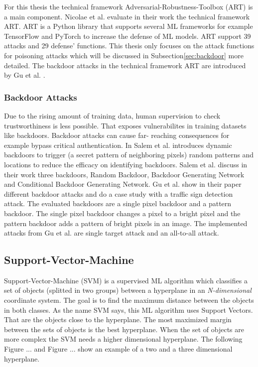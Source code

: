 For this thesis the technical framework Adversarial-Robustness-Toolbox (ART) \cite{art2018} is a main component. Nicolae et al. \cite{DBLP:journals/corr/abs-1807-01069} evaluate in their work the
technical framework ART. ART is a Python library that supports several ML frameworks for example TensorFlow and PyTorch to increase the defense of ML models. ART support 39 attacks and 29 defense'
functions. This thesis only focuses on the attack functions for poisoning attacks which will be discussed in Subsection\ref{sec:backdoor} more detailed. The backdoor attacks in the technical framework
ART are introduced by Gu et al. \cite{DBLP:journals/corr/abs-1708-06733}.

\subsubsection*{Backdoor Attacks}
Due to the rising amount of training data, human supervision to check trustworthiness is less possible. That exposes vulnerabilites in training datasets like backdoors. Backdoor attacks can cause far-
reaching consequences for example bypass critical authentication. In \cite{DBLP:journals/corr/abs-2003-03675} Salem et al. introduces dynamic backdoors to trigger (a secret pattern of neighboring
pixels) random patterns and locations to reduce the efficacy on identifying backdoors. Salem et al. discuss in their work three backdoors, Random Backdoor, Backdoor Generating Network and Conditional
Backdoor Generating Network.
Gu et al. show in their paper different backdoor attacks and do a case study with a traffic sign detection attack. The evaluated backdoors are a single pixel backdoor and a pattern backdoor. The single
pixel backdoor changes a pixel to a bright pixel and the pattern backdoor adds a pattern of bright pixels in an image. The implemented attacks from Gu et al. are single target attack and an all-to-all attack.

\subsection{Support-Vector-Machine}

Support-Vector-Machine (SVM) is a supervised ML algorithm which classifies a set of objects (splitted in two groups) between a hyperplane in an \textit{N-dimensional} coordinate system. The goal is to find the maximum distance between the objects in both classes. As the name SVM says, this ML algorithm uses Support Vectors. That are the objects close to the hyperplane. The most maximized margin between the sets of objects is the best hyperplane. When the set of objects are more complex the SVM needs a higher dimensional hyperplane. The following Figure ... and Figure ... show an example of a two and a three dimensional hyperplane. \\ \\

